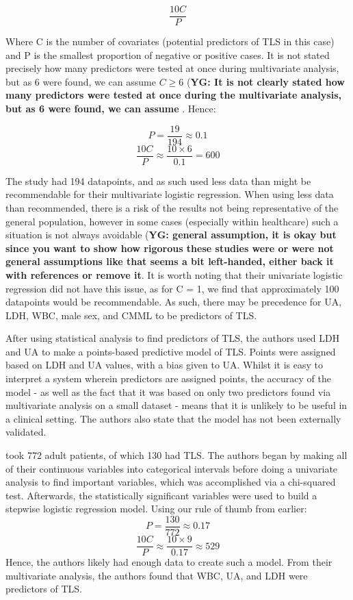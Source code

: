 \documentclass{article}
\begin{document}
\[\frac{10C}{P}\]

Where C is the number of covariates (potential predictors of TLS in this case) and P is the smallest proportion of negative or positive cases. It is not stated precisely how many predictors were tested at once during multivariate analysis, but as 6 were found, we can assume \(C \geq 6\) (\textbf{YG: It is not clearly stated how many predictors were tested at once during the multivariate analysis, but as 6 were found, we can assume }. Hence:

\[P = \frac{19}{194} \approx 0.1 \]
\[\frac{10C}{P} \approx \frac{10 \times 6}{0.1} = 600\]

The study had 194 datapoints, and as such used less data than might be recommendable for their multivariate logistic regression. When using less data than recommended, there is a risk of the results not being representative of the general population, however in some cases (especially within healthcare) such a situation is not always avoidable (\textbf{YG: general assumption, it is okay but since you want to show how rigorous these studies were or were not general assumptions like that seems a bit left-handed, either back it with references or remove it}. It is worth noting that their univariate logistic regression did not have this issue, as for C = 1, we find that approximately 100 datapoints would be recommendable. As such, there may be precedence for UA, LDH, WBC, male sex, and CMML to be predictors of TLS.

After using statistical analysis to find predictors of TLS, the authors used LDH and UA to make a points-based predictive model of TLS. Points were assigned based on LDH and UA values, with a bias given to UA. Whilst it is easy to interpret a system wherein predictors are assigned points, the accuracy of the model - as well as the fact that it was based on only two predictors found via multivariate analysis on a small dataset - means that it is unlikely to be useful in a clinical setting. The authors also state that the model has not been externally validated. %


\cite{montesinos2008tumor} took 772 adult patients, of which 130 had TLS. The authors began by making all of their continuous variables into categorical intervals before doing a univariate analysis to find important variables, which was accomplished via a chi-squared test. Afterwards, the statistically significant variables were used to build a stepwise logistic regression model. Using our rule of thumb from earlier:
\[P =\frac{130}{772} \approx 0.17 \]
\[ \frac{10C}{P} \approx \frac{10\times9}{0.17} \approx 529 \]
Hence, the authors likely had enough data to create such a model. From their multivariate analysis, the authors found that WBC, UA, and LDH were predictors of TLS.
\end{document}
